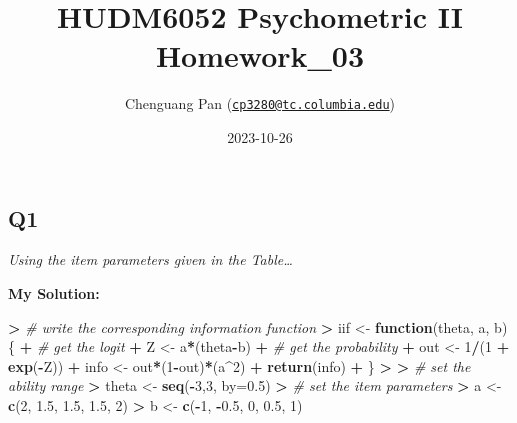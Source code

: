 \documentclass[
]{article}
\title{HUDM6052 Psychometric II Homework\_03}
\author{Chenguang Pan
(\href{mailto:cp3280@tc.columbia.edu}{\nolinkurl{cp3280@tc.columbia.edu}})}
\date{2023-10-26}
\newenvironment{Shaded}{\begin{snugshade}}{\end{snugshade}}
\newcommand{\AttributeTok}[1]{\textcolor[rgb]{0.13,0.29,0.53}{#1}}
\newcommand{\CommentTok}[1]{\textcolor[rgb]{0.56,0.35,0.01}{\textit{#1}}}
\newcommand{\ControlFlowTok}[1]{\textcolor[rgb]{0.13,0.29,0.53}{\textbf{#1}}}
\newcommand{\DecValTok}[1]{\textcolor[rgb]{0.00,0.00,0.81}{#1}}
\newcommand{\ErrorTok}[1]{\textcolor[rgb]{0.64,0.00,0.00}{\textbf{#1}}}
\newcommand{\FloatTok}[1]{\textcolor[rgb]{0.00,0.00,0.81}{#1}}
\newcommand{\FunctionTok}[1]{\textcolor[rgb]{0.13,0.29,0.53}{\textbf{#1}}}
\newcommand{\NormalTok}[1]{#1}
\newcommand{\OtherTok}[1]{\textcolor[rgb]{0.56,0.35,0.01}{#1}}
\newcommand{\SpecialCharTok}[1]{\textcolor[rgb]{0.81,0.36,0.00}{\textbf{#1}}}
\begin{document}
\maketitle

\setcounter{tocdepth}{4}
\tableofcontents

\hypertarget{q1}{%
\subsection{Q1}\label{q1}}

\emph{Using the item parameters given in the Table\ldots{}}

\textbf{My Solution:}

\begin{Shaded}
\begin{Highlighting}[]
\SpecialCharTok{\textgreater{}} \CommentTok{\# write the corresponding information function}
\ErrorTok{\textgreater{}}\NormalTok{ iif }\OtherTok{\textless{}{-}} \ControlFlowTok{function}\NormalTok{(theta, a, b)\{}
\SpecialCharTok{+}   \CommentTok{\# get the logit}
\SpecialCharTok{+}\NormalTok{   Z }\OtherTok{\textless{}{-}}\NormalTok{ a}\SpecialCharTok{*}\NormalTok{(theta}\SpecialCharTok{{-}}\NormalTok{b)}
\SpecialCharTok{+}   \CommentTok{\# get the probability}
\SpecialCharTok{+}\NormalTok{   out }\OtherTok{\textless{}{-}} \DecValTok{1}\SpecialCharTok{/}\NormalTok{(}\DecValTok{1} \SpecialCharTok{+} \FunctionTok{exp}\NormalTok{(}\SpecialCharTok{{-}}\NormalTok{Z))}
\SpecialCharTok{+}\NormalTok{   info }\OtherTok{\textless{}{-}}\NormalTok{ out}\SpecialCharTok{*}\NormalTok{(}\DecValTok{1}\SpecialCharTok{{-}}\NormalTok{out)}\SpecialCharTok{*}\NormalTok{(a}\SpecialCharTok{\^{}}\DecValTok{2}\NormalTok{)}
\SpecialCharTok{+}   \FunctionTok{return}\NormalTok{(info)}
\SpecialCharTok{+}\NormalTok{ \}}
\SpecialCharTok{\textgreater{}} 
\ErrorTok{\textgreater{}} \CommentTok{\# set the ability range}
\ErrorTok{\textgreater{}}\NormalTok{ theta }\OtherTok{\textless{}{-}} \FunctionTok{seq}\NormalTok{(}\SpecialCharTok{{-}}\DecValTok{3}\NormalTok{,}\DecValTok{3}\NormalTok{, }\AttributeTok{by=}\FloatTok{0.5}\NormalTok{)}
\SpecialCharTok{\textgreater{}} \CommentTok{\# set the item parameters}
\ErrorTok{\textgreater{}}\NormalTok{ a }\OtherTok{\textless{}{-}} \FunctionTok{c}\NormalTok{(}\DecValTok{2}\NormalTok{, }\FloatTok{1.5}\NormalTok{, }\FloatTok{1.5}\NormalTok{, }\FloatTok{1.5}\NormalTok{, }\DecValTok{2}\NormalTok{)}
\SpecialCharTok{\textgreater{}}\NormalTok{ b }\OtherTok{\textless{}{-}} \FunctionTok{c}\NormalTok{(}\SpecialCharTok{{-}}\DecValTok{1}\NormalTok{, }\SpecialCharTok{{-}}\FloatTok{0.5}\NormalTok{, }\DecValTok{0}\NormalTok{, }\FloatTok{0.5}\NormalTok{, }\DecValTok{1}\NormalTok{)}

\end{Highlighting}
\end{Shaded}
\end{document}
